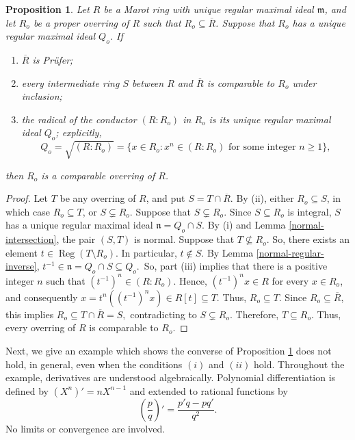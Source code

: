 \documentclass[12pt]{article}
\newtheorem{proposition}{Proposition}
\newcommand{\Reg}{\operatorname{Reg}}
\begin{document}
\begin{proposition}\label{radical-conductor-comparable}
		Let $R$ be a Marot ring with unique regular maximal ideal $\mathfrak{m}$, and let $R_o$ be a proper overring of $R$ such that $R_o\subseteq\overline R$. Suppose that $R_o$ has a unique regular maximal ideal $Q_o$. If
		\begin{enumerate}[label=(\roman*)]
			\item $\overline R$ is Prüfer;
			\item every intermediate ring $S$ between $R$ and $\overline R$ is comparable to $R_o$ under inclusion;
			\item the radical of the conductor $(R:R_o)$ in $R_o$ is its unique regular maximal ideal $Q_o$; explicitly, \[ Q_o=\sqrt{(R:R_o)} =\{x\in R_o:x^n\in(R:R_o) \text{ for some integer }n\geq1\}, \]
		\end{enumerate}
		then $R_o$ is a comparable overring of $R$.
	\end{proposition}
	\begin{proof}
		Let $T$ be any overring of $R$, and put $S=T\cap\overline R$. By (ii), either $R_o\subseteq S$, in which case $R_o\subseteq T$, or $S\subsetneq R_o$. Suppose that $S\subsetneq R_o$. Since $S\subseteq R_o$ is integral, $S$ has a unique regular maximal ideal $\mathfrak{n}=Q_o\cap S.$ By (i) and Lemma \ref{normal-intersection}, the pair $(S,T)$ is normal. Suppose that $T\nsubseteq R_o$. So, there exists an element $t\in\Reg(T\setminus R_o)$. In particular, $t\notin S$. By Lemma \ref{normal-regular-inverse}, $t^{-1}\in\mathfrak{n}=Q_o\cap S\subseteq Q_o.$ So, part (iii) implies that there is a positive integer $n$ such that $(t^{-1})^n\in(R:R_o). $ Hence, $(t^{-1})^nx\in R$ for every $x\in R_o$, and consequently $x=t^n((t^{-1})^nx)\in R[t]\subseteq T.$ Thus, $R_o\subseteq T$. Since $R_o\subseteq\overline R$, this implies $R_o\subseteq T\cap\overline R=S, $ contradicting to $S\subsetneq R_o$. Therefore, $T\subseteq R_o$. Thus, every overring of $R$ is comparable to $R_o$.
	\end{proof}
	Next, we give an example which shows the converse of Proposition \ref{radical-conductor-comparable} does not hold, in general, even when the conditions $(i)$ and $(ii)$ hold. Throughout the example, derivatives are understood algebraically. Polynomial differentiation is defined by $(X^n)'=nX^{n-1}$ and extended to rational functions by
	\[\left(\frac pq\right)'=\frac{p'q-pq'}{q^2}.\]
	No limits or convergence are involved.
\end{document}
